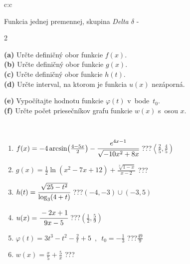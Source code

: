 \documentclass[10pt]{report}
\begin{document}
\begin{tabular}{c:c}
\begin{minipage}[c][104.5mm][t]{0.5\linewidth}
\begin{center}
\vspace{7mm}
{\huge Funkcia jednej premennej, skupina \textit{Delta $\delta$} -}\\[5mm]
\begin{minipage}{0.95\linewidth}
\begin{center}
{\small \begin{multicols}{2} \raggedright
\textbf{(a)} Určte definičný obor funkcie \(f(x)\). \\[1mm]
\textbf{(b)} Určte definičný obor funkcie \(g(x)\). \\[1mm]
\textbf{(c)} Určte definičný obor funkcie \(h(t)\). \\[1mm]
\textbf{(d)} Určte interval, na ktorom je funkcia \(u(x)\) nezáporná. \par \columnbreak
\textbf{(e)} Vypočítajte hodnotu funkcie \(\varphi(t)\) v~bode~\(t_0\). \\[1mm]
\textbf{(f)} Určte počet priesečníkov grafu funkcie \(w(x)\) s~osou \(x\). \\[1mm]
\end{multicols}
}
\end{center}
\end{minipage}
\\[4mm]
\begin{minipage}{0.79\linewidth}
\begin{center}
\begin{varwidth}{\linewidth}
\begin{enumerate}
\small
\item $f(x) = -4\arcsin\!\left( \frac{4-5x}{2} \right) - \cfrac{e^{4x-1}}{\sqrt{-10x^2+8x}}$\quad \dotfill\; ???\;\dotfill \quad $\left\langle\frac{2}{5} , \frac{4}{5}\right)$
\item $g(x) = \frac{1}{2} \ln{\!(x^2-7x+12)}+\frac{\sqrt[3]{1-x}}{x-2}$\quad \dotfill\; ???\;\dotfill {}
\item $h(t) = \cfrac{\sqrt{25-t^2}}{\log_3(4+t)}$\quad \dotfill\; ???\;\dotfill \quad $\left(-4 , -3\right)\cup\left(-3 , 5\right)$
\item $u(x) = \cfrac{-2x+1}{9x-5}$\quad \dotfill\; ???\;\dotfill \quad $\left(\frac{1}{2} , \frac{5}{9}\right)$
\item $\varphi(t) = 3t^3-t^2-\frac{2}{t}+5 \enspace , \enspace t_0=-\frac{1}{3}$\quad \dotfill\; ???\;\dotfill \quad $\frac{49}{9}$
\item $w(x) = \frac{x}{5}+\frac{5}{x}$\quad \dotfill\; ???\;\dotfill {}

\end{enumerate}
\end{varwidth}
\end{center}
\end{minipage}
\end{center}
\end{minipage}
\end{tabular}
\end{document}
